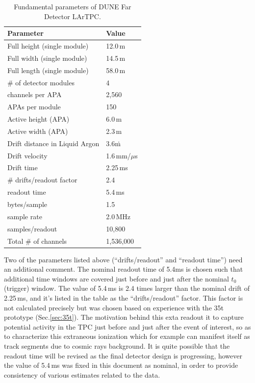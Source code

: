 \begin{table}[ht!]
	\centering
	\begin{tabular}{| p{2.5in} | p{1in} |}
		\hline
		\textbf{Parameter} & \textbf{Value} \\ \hline
		Full height (single module) & 12.0\,m \\ \hline
		Full width (single module) & 14.5\,m \\ \hline
		Full length (single module) & 58.0\,m \\ \hline
		\# of detector modules & 4 \\ \hline
		\hline
		channels per APA & 2,560 \\ \hline
		APAs per module & 150 \\ \hline
		Active height (APA) & 6.0\,m \\ \hline
		Active width (APA) & 2.3\,m \\ \hline  \hline
		Drift distance in Liquid Argon & 3.6\.m \\
		\hline
		Drift velocity & 1.6\,mm/$\mu$s \\ \hline
		Drift time & 2.25\,ms \\ \hline
		\# drifts/readout factor & 2.4 \\ \hline
		readout time & 5.4\,ms \\ \hline \hline
		bytes/sample & 1.5 \\ \hline
		sample rate & 2.0\,MHz \\ \hline
		samples/readout & 10,800 \\
		\hline \hline
		Total \# of channels & 1,536,000 \\
		\hline
	\end{tabular}
	\caption{Fundamental parameters of DUNE Far Detector LArTPC.}
	\label{tab:fundamental-parameters}
\end{table}

Two of the parameters listed above (``drifts/readout'' and ``readout time'') need an additional comment.
The nominal readout time of 5.4ms is chosen such that additional time windows are covered just before and just
after the nominal $t_0$ (trigger) window. The value of 5.4\,ms is 2.4 times larger than the nominal drift of 2.25\,ms,
and it's listed in the table as the ``drifts/readout'' factor. This factor is not calculated precisely but was chosen based
on experience with the 35t prototype (Sec.\ref{sec:35t}). The motivation behind this exta readout it to capture
potential activity in the TPC just before and just after the event of interest, so as to characterize this extraneous
ionization which for example can manifest itself as track segments due to cosmic rays background. It is quite
possible that the readout time will be revised as the final detector design is progressing, however the value of 5.4\,ms
was fixed in this document as nominal, in order to provide consistency of various estimates related to the data.

